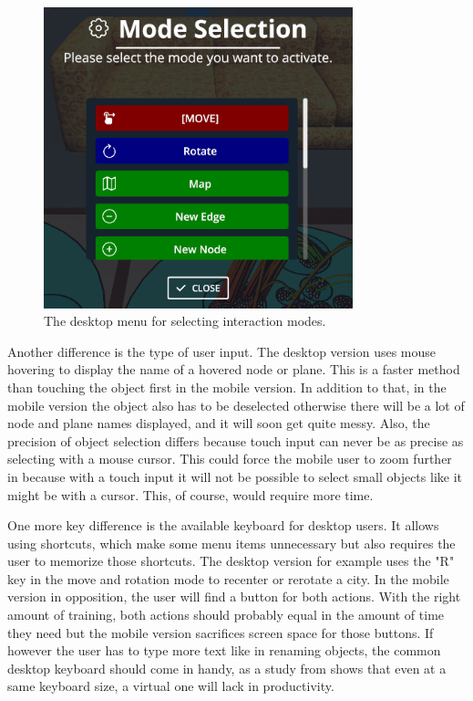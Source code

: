 \begin{figure}[htb]
  \centering
  \includegraphics[width=0.8\textwidth]{Evaluation/img/menu.png}
  \caption{The desktop menu for selecting interaction modes.}\label{fig:menu}
\end{figure}

Another difference is the type of user input.
The desktop version uses mouse hovering to display the name of a hovered \gls{node} or \gls{plane}.
This is a faster method than touching the object first in the mobile version.
In addition to that, in the mobile version the object also has to be deselected otherwise there will be a lot of \gls{node} and \gls{plane} names displayed, and it will soon get quite messy.
Also, the precision of object selection differs because touch input can never be as precise as selecting with a mouse cursor.
This could force the mobile user to zoom further in because with a touch input it will not be possible to select small objects like it might be with a cursor.
This, of course, would require more time.

One more key difference is the available keyboard for desktop users.
It allows using \glspl{shortcut}, which make some menu items unnecessary but also requires the user to memorize those \glspl{shortcut}.
The desktop version for example uses the "R" key in the move and rotation mode to recenter or rerotate a \gls{city}.
In the mobile version in opposition, the user will find a button for both actions.
With the right amount of training, both actions should probably equal in the amount of time they need but the mobile version sacrifices screen space for those buttons.
If however the user has to type more text like in renaming objects, the common desktop keyboard should come in handy, as a study from \cite{kim2014differences} shows that even at a same keyboard size, a virtual one will lack in productivity.
